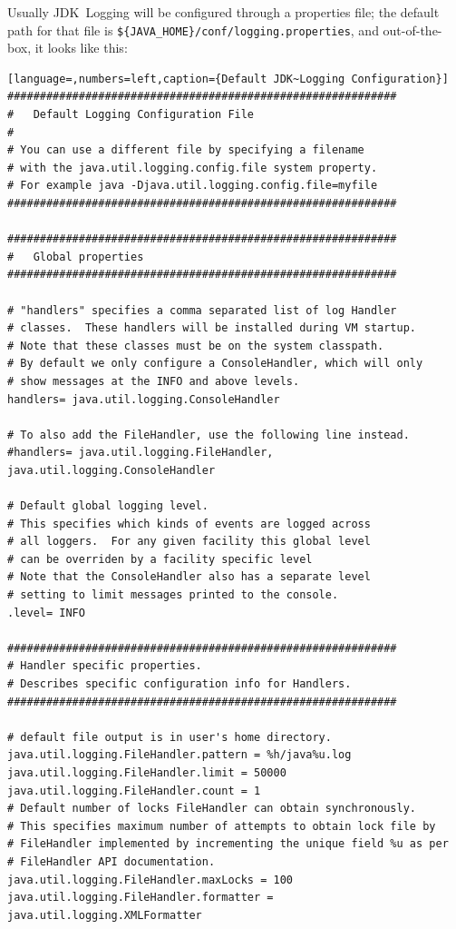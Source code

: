 \documentclass[11pt,a4paper, titlepage, parskip=half, headsepline, footsepline, cleardoublepage=current, headheight=1cm]{scrbook}
\begin{document}
Usually JDK~Logging will be configured through a properties file; the default path for that file is \verb#${JAVA_HOME}/conf/logging.properties#, and out-of-the-box, it looks like this:
\begin{lstlisting}[language=,numbers=left,caption={Default JDK~Logging Configuration}]
############################################################
#  	Default Logging Configuration File
#
# You can use a different file by specifying a filename
# with the java.util.logging.config.file system property.  
# For example java -Djava.util.logging.config.file=myfile
############################################################

############################################################
#  	Global properties
############################################################

# "handlers" specifies a comma separated list of log Handler 
# classes.  These handlers will be installed during VM startup.
# Note that these classes must be on the system classpath.
# By default we only configure a ConsoleHandler, which will only
# show messages at the INFO and above levels.
handlers= java.util.logging.ConsoleHandler

# To also add the FileHandler, use the following line instead.
#handlers= java.util.logging.FileHandler, java.util.logging.ConsoleHandler

# Default global logging level.
# This specifies which kinds of events are logged across
# all loggers.  For any given facility this global level
# can be overriden by a facility specific level
# Note that the ConsoleHandler also has a separate level
# setting to limit messages printed to the console.
.level= INFO

############################################################
# Handler specific properties.
# Describes specific configuration info for Handlers.
############################################################

# default file output is in user's home directory.
java.util.logging.FileHandler.pattern = %h/java%u.log
java.util.logging.FileHandler.limit = 50000
java.util.logging.FileHandler.count = 1
# Default number of locks FileHandler can obtain synchronously.
# This specifies maximum number of attempts to obtain lock file by 
# FileHandler implemented by incrementing the unique field %u as per 
# FileHandler API documentation.
java.util.logging.FileHandler.maxLocks = 100
java.util.logging.FileHandler.formatter = java.util.logging.XMLFormatter


\end{lstlisting}
\end{document}
